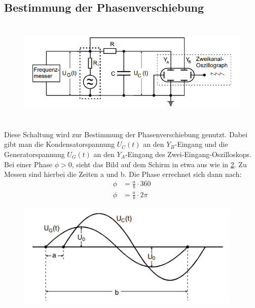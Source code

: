 \subsection{Bestimmung der Phasenverschiebung}
\begin{figure}[H]
    \centering
    \captionsetup{justification=centering}
    \includegraphics[height=5cm]{"Phase_RCKreis.png"}
    \label{Fig:Phase}
\end{figure}
Diese Schaltung wird zur Bestimmung der Phasenverschiebung genutzt. Dabei gibt man die Kondensatorspannung $U_C(t)$ an den $Y_B$-Eingang und die Generatorspannung $U_G(t)$ an den $Y_A$-Eingang des Zwei-Eingang-Oszilloskops. Bei einer Phase $\phi>0$, sieht das Bild auf dem Schirm in etwa aus wie in \ref{Fig:Schirm}. Zu Messen sind hierbei die Zeiten a und b. Die Phase errechnet sich dann nach:
\begin{align}
    \phi&=\frac{a}{b}\cdot 360\\
    \phi&=\frac{a}{b}\cdot 2\pi
\end{align}
\begin{figure}[H]
    \centering
    \captionsetup{justification=centering}
    \includegraphics[height=5cm]{"Schirm_RCKreis.png"}
    \label{Fig:Schirm}
\end{figure}